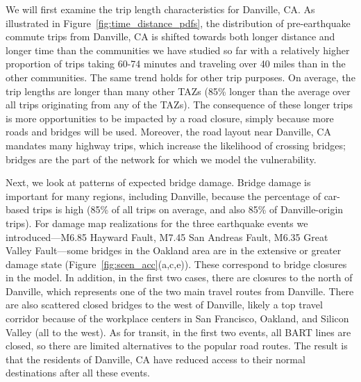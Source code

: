 
We will first examine the trip length characteristics for Danville, CA. As illustrated in Figure~\ref{fig:time_distance_pdfs}, the distribution of pre-earthquake commute trips from Danville, CA is shifted towards both longer distance and longer time than the communities we have studied so far with a relatively higher proportion of trips taking 60-74 minutes and traveling over 40 miles than in the other communities. The same trend holds for other trip purposes. On average, the trip lengths are longer than many other TAZs (85\% longer than the average over all trips originating from any of the TAZs). The consequence of these longer trips is more opportunities to be impacted by a road closure, simply because more roads and bridges will be used. Moreover, the road layout near Danville, CA mandates many highway trips, which increase the likelihood of crossing bridges; bridges are the part of the network for which we model the vulnerability. 


Next, we look at patterns of expected bridge damage. Bridge damage is important for many regions, including Danville, because the percentage of car-based trips is high (85\% of all trips on average, and also 85\% of Danville-origin trips). For damage map realizations for the three  earthquake events we introduced---M6.85 Hayward Fault, M7.45 San Andreas Fault, M6.35 Great Valley Fault---some bridges in the Oakland area are in the extensive or greater damage state (Figure~\ref{fig:scen_acc}{(a,c,e)}). These correspond to bridge closures in the model. In addition, in the first two cases, there are closures to the north of Danville, which represents one of the two main travel routes from Danville. There are also scattered closed bridges to the west of Danville, likely a top travel corridor because of the workplace centers in San Francisco, Oakland, and Silicon Valley (all to the west). As for transit, in the first two events, all BART lines are closed, so there are limited alternatives to the popular road routes. The result is that the residents of Danville, CA have reduced access to their normal destinations after all these events. 

